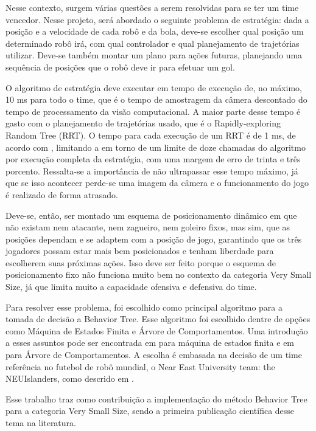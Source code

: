 \documentclass[conference]{IEEEtran}
\begin{document}
Nesse contexto, surgem várias questões a serem resolvidas para se ter um time vencedor. Nesse projeto, será abordado o seguinte problema de estratégia: dada a posição e a velocidade de cada robô e da bola, deve-se escolher qual posição um determinado robô irá, com qual controlador  e qual planejamento de trajetórias utilizar. Deve-se também montar um plano para ações futuras, planejando uma sequência de posições que o robô deve ir para efetuar um gol.

O algoritmo de estratégia deve executar em tempo de execução de, no máximo, 10 ms para todo o time, que é o tempo de amostragem da câmera descontado do tempo de processamento da visão computacional. A maior parte desse tempo é gasto com o planejamento de trajetórias usado, que é o Rapidly-exploring Random Tree (RRT). O tempo para cada execução de um RRT é de 1 ms, de acordo com \cite{franzoni_rrt}, limitando a em torno de um limite de doze chamadas do algoritmo por execução completa da estratégia, com uma margem de erro de trinta e três porcento. Ressalta-se a importância de não ultrapassar esse tempo máximo, já que se isso acontecer perde-se uma imagem da câmera e o funcionamento do jogo é realizado de forma atrasado.

Deve-se, então, ser montado um esquema de posicionamento dinâmico em que não existam nem atacante, nem zagueiro, nem goleiro fixos, mas sim, que as posições dependam e se adaptem com a posição de jogo, garantindo que os três jogadores possam estar mais bem posicionados e tenham liberdade para escolherem suas próximas ações. Isso deve ser feito porque o esquema de posicionamento fixo não funciona muito bem no contexto da categoria Very Small Size, já que limita muito a capacidade ofensiva e defensiva do time.

Para resolver esse problema, foi escolhido como principal algoritmo para a tomada de decisão a Behavior Tree. Esse algoritmo foi escolhido dentre de opções como Máquina de Estados Finita e Árvore de Comportamentos. Uma introdução a esses assuntos pode ser encontrada em \cite{orozcomaquinas} para máquina de estados finita e em \cite{decision_tree} para Árvore de Comportamentos. A escolha é embasada na decisão de um time referência no futebol de robô mundial, o Near East University team: the NEUIslanders, como descrido em \cite{NEUIslanders_ssl}.

Esse trabalho traz como contribuição a implementação do método Behavior Tree para a categoria Very Small Size, sendo a primeira publicação científica desse tema na literatura.
\end{document}
